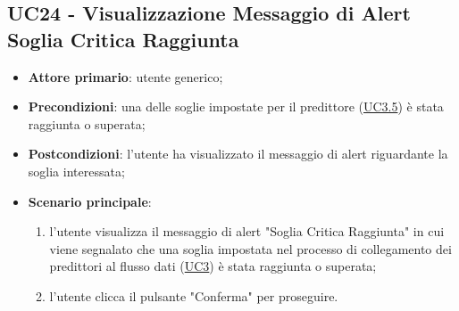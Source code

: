 
\label{par:UC24}
	\subsection{UC24 - Visualizzazione Messaggio di Alert Soglia Critica Raggiunta}
		\begin{itemize}
			\item\textbf{Attore primario}: utente generico;
			\item\textbf{Precondizioni}: una delle soglie impostate per il predittore (\hyperref[par:UC3.5]{UC3.5}) è stata raggiunta o superata;
			\item\textbf{Postcondizioni}: l’utente ha visualizzato il messaggio di alert riguardante la soglia interessata;
			\item\textbf{Scenario principale}:
				\begin{enumerate}
					\item l’utente visualizza il messaggio di alert "Soglia Critica Raggiunta" in cui viene segnalato che una soglia impostata nel processo di collegamento dei predittori al flusso dati (\hyperref[par:UC3]{UC3}) è stata raggiunta o superata;
					\item l'utente clicca il pulsante "Conferma" per proseguire.		
				\end{enumerate}		
		\end{itemize}
	






